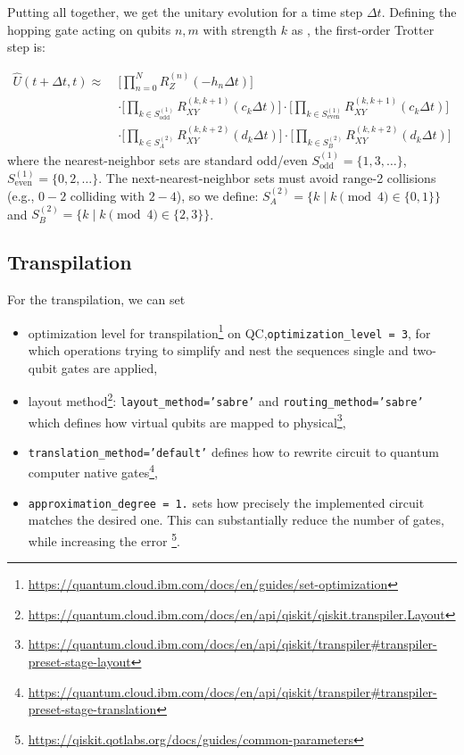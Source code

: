 \documentclass[%
nofootinbib,
 amsmath,amssymb,
 aps,
 prd,
10pt]{revtex4-2}
\begin{document}
Putting all together, we get the unitary evolution for a time step $\Delta t$. Defining the hopping gate acting on qubits $n, m$ with strength $k$ as , the first-order Trotter step is:

\begin{equation}
    \begin{aligned}
    \hat U(t+\Delta t, t) \approx \;& \Bigg[\prod_{n=0}^{N} R_Z^{(n)}(-h_n \Delta t) \Bigg] \\
    &\cdot \Bigg[ \prod_{k \in S_{\text{odd}}^{(1)}} R_{XY}^{(k, k+1)}(c_{k} \Delta t) \Bigg] \cdot \Bigg[ \prod_{k \in S_{\text{even}}^{(1)}} R_{XY}^{(k, k+1)}(c_{k} \Delta t) \Bigg] \\
    &\cdot \Bigg[ \prod_{k \in S_{A}^{(2)}} R_{XY}^{(k, k+2)}(d_{k} \Delta t) \Bigg] \cdot \Bigg[ \prod_{k \in S_{B}^{(2)}} R_{XY}^{(k, k+2)}(d_{k} \Delta t) \Bigg]
    \end{aligned}
\end{equation}
where the nearest-neighbor sets are standard odd/even $S_{\text{odd}}^{(1)} = \{1, 3, \dots\}$, $S_{\text{even}}^{(1)} = \{0, 2, \dots\}$. 
The next-nearest-neighbor sets must avoid range-2 collisions (e.g., $0-2$ colliding with $2-4$), so we define:
$S_{A}^{(2)} = \{k \mid k \pmod 4 \in \{0, 1\}\}$ and $S_{B}^{(2)} = \{k \mid k \pmod 4 \in \{2, 3\}\}$.

\subsection{Transpilation}
For the transpilation, we can set
\begin{itemize}
    \item optimization level for transpilation\footnote{\url{https://quantum.cloud.ibm.com/docs/en/guides/set-optimization}} on QC,\texttt{optimization\_level = 3}, for which operations trying to simplify and nest the sequences single and two-qubit gates are applied,
    \item layout method\footnote{\url{https://quantum.cloud.ibm.com/docs/en/api/qiskit/qiskit.transpiler.Layout}}:  \texttt{layout\_method='sabre'} and \texttt{routing\_method='sabre'} which defines how virtual qubits are mapped to physical\footnote{\url{https://quantum.cloud.ibm.com/docs/en/api/qiskit/transpiler\#transpiler-preset-stage-layout}}, 
    \item \texttt{translation\_method='default'} defines how to rewrite circuit to quantum computer native gates\footnote{\url{https://quantum.cloud.ibm.com/docs/en/api/qiskit/transpiler\#transpiler-preset-stage-translation}},
    \item \texttt{approximation\_degree = 1.} sets how precisely the implemented circuit matches the desired one. This can substantially reduce the number of gates, while increasing the error \footnote{\url{https://qiskit.qotlabs.org/docs/guides/common-parameters}}.
\end{itemize}
\end{document}
